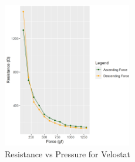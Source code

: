 \begin{figure}[b]
    \vspace{-0.7cm}
      \centering
      \includegraphics[width=0.5\textwidth]{figs/ascending_descending.png}
      \vspace{-0.2cm}
      \caption[Resistance - Pressure]{Resistance vs Pressure for Velostat}
      \label{fig:velostat}
\vspace{1.0cm}
\end{figure}